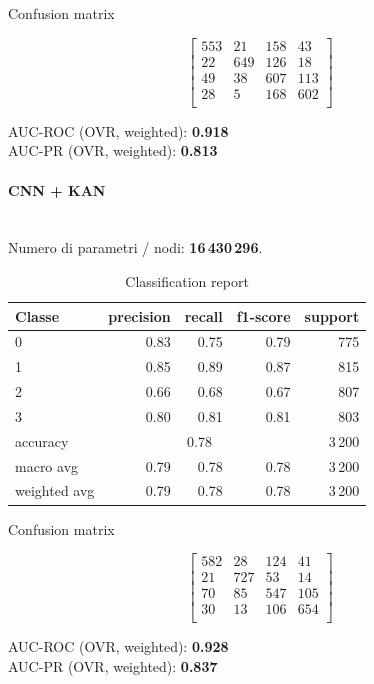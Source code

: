 \documentclass[a4paper,12pt]{report}
\begin{document}
	\begin{table}[H]
		\centering
		\caption{Confusion matrix}
		\label{tab:cm_cnn_mlp}
		\[
		\begin{bmatrix}
			553 & 21  & 158 & 43 \\
			22  & 649 & 126 & 18 \\
			49  & 38  & 607 & 113 \\
			28  & 5   & 168 & 602 \\
		\end{bmatrix}
		\]
		\vspace{1mm}
		
		AUC-ROC (OVR, weighted): \textbf{0.918} \\
		AUC-PR  (OVR, weighted): \textbf{0.813}
	\end{table}
	
	\paragraph{CNN + KAN} \mbox{}\\
	Numero di parametri / nodi: \textbf{16\,430\,296}.
	
	\begin{table}[H]
		\centering
		\caption{Classification report}
		\label{tab:cr_cnn_kan}
		\begin{tabular}{lrrrr}
			\toprule
			Classe & precision & recall & f1-score & support \\
			\midrule
			0 & 0.83 & 0.75 & 0.79 & 775 \\
			1 & 0.85 & 0.89 & 0.87 & 815 \\
			2 & 0.66 & 0.68 & 0.67 & 807 \\
			3 & 0.80 & 0.81 & 0.81 & 803 \\
			\midrule
			accuracy & \multicolumn{3}{c}{0.78} & 3\,200 \\
			macro avg & 0.79 & 0.78 & 0.78 & 3\,200 \\
			weighted avg & 0.79 & 0.78 & 0.78 & 3\,200 \\
			\bottomrule
		\end{tabular}
	\end{table}
	
	\begin{table}[H]
		\centering
		\caption{Confusion matrix}
		\label{tab:cm_cnn_kan}
		\[
		\begin{bmatrix}
			582 & 28  & 124 & 41  \\
			21  & 727 & 53  & 14  \\
			70  & 85  & 547 & 105 \\
			30  & 13  & 106 & 654 \\
		\end{bmatrix}
		\]
		\vspace{1mm}
		
		AUC-ROC (OVR, weighted): \textbf{0.928} \\
		AUC-PR  (OVR, weighted): \textbf{0.837}
	\end{table}
	
\end{document}
